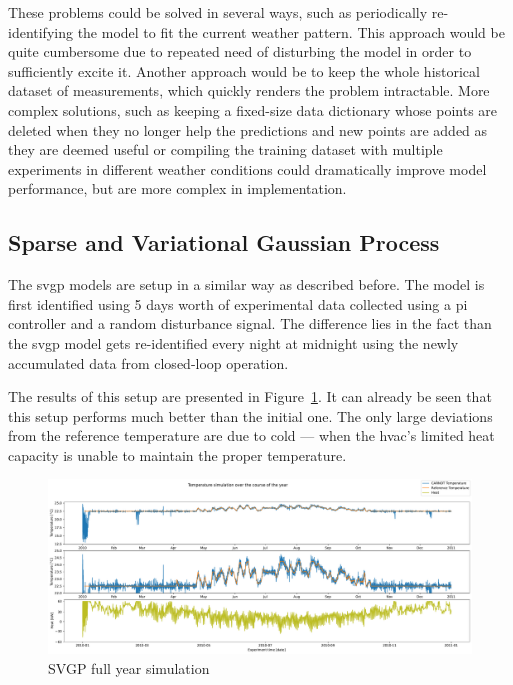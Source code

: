 These problems could be solved in several ways, such as periodically
re-identifying the model to fit the current weather pattern. This approach would
be quite cumbersome due to repeated need of disturbing the model in order to
sufficiently excite it. Another approach would be to keep the whole historical
dataset of measurements, which quickly renders the problem intractable. More
complex solutions, such as keeping a fixed-size data dictionary whose points are
deleted when they no longer help the predictions and new points are added as
they are deemed useful or compiling the training dataset with multiple
experiments in different weather conditions could dramatically improve model
performance, but are more complex in implementation.


\subsection{Sparse and Variational Gaussian Process}\label{sec:SVGP_results}

The \acrlong{svgp} models are setup in a similar way as described before. The
model is first identified using 5 days worth of experimental data collected
using a \acrshort{pi} controller and a random disturbance signal. The difference
lies in the fact than the \acrshort{svgp} model gets re-identified every night
at midnight using the newly accumulated data from closed-loop operation.

The results of this setup are presented in
Figure~\ref{fig:SVGP_fullyear_simulation}. It can already be seen that this
setup performs much better than the initial one. The only large deviations from
the reference temperature are due to cold --- when the \acrshort{hvac}'s limited
heat capacity is unable to maintain the proper temperature.


\begin{figure}[ht]
    \centering
    \includegraphics[width =
    \textwidth]{Plots/1_SVGP_480pts_inf_window_12_averageYear_fullyear.pdf}
    \caption{SVGP full year simulation}
    \label{fig:SVGP_fullyear_simulation}
\end{figure}

